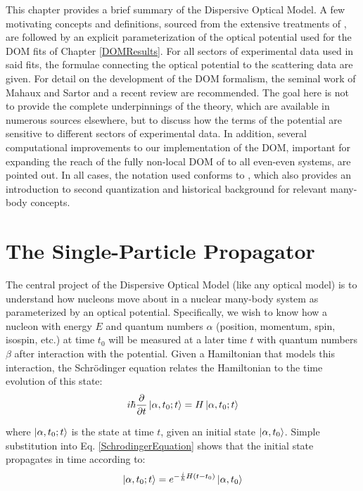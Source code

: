 This chapter provides a brief summary of the Dispersive Optical Model.
A few motivating concepts and definitions, sourced from the extensive treatments of \cite{MahzoonPhDThesis, MBTE},
are followed by an explicit parameterization of the optical potential used for the DOM fits of Chapter \ref{DOMResults}.
For all sectors of experimental data used in said fits, the formulae connecting the optical potential
to the scattering data are given. For detail on the development of the DOM formalism, the seminal
work of Mahaux and Sartor \cite{Mahaux1991} and a recent review \cite{Dickhoff2018} are recommended.
The goal here is not to provide the complete underpinnings of the theory, which are available in
numerous sources elsewhere, but to discuss how the terms of the potential are sensitive
to different sectors of experimental data.
In addition, several computational improvements to our implementation of the DOM, important for
expanding the reach of the fully non-local DOM of \cite{MahzoonPhDThesis} to all even-even systems,
are pointed out. In all cases, the notation used conforms to \cite{MBTE}, which also provides an
introduction to second quantization and historical background for relevant many-body concepts.

\section{The Single-Particle Propagator}
The central project of the Dispersive Optical Model (like any optical model) is
to understand how nucleons move about in a nuclear many-body system as parameterized by an optical
potential.
Specifically, we wish to know
how a nucleon with energy $E$ and quantum numbers $\alpha$
(position, momentum, spin, isospin, etc.) at time $t_{0}$ will be measured at a
later time $t$ with quantum numbers $\beta$ after interaction with the
potential. Given a
Hamiltonian that models this interaction, the Schr\"odinger equation
relates the Hamiltonian to the time evolution of this state:
\begin{equation} \label{SchrodingerEquation}
    i\hbar\frac{\partial}{\partial t}\ket{\alpha, t_{0}; t} = H\ket{\alpha, t_{0}; t}
\end{equation}

\noindent
where $\ket{\alpha, t_{0}; t}$ is the state at time $t$, given an initial state
$\ket{\alpha, t_{0}}$. Simple substitution into Eq. \ref{SchrodingerEquation} shows
that the initial state propagates in time according to:
\begin{equation}
    \ket{\alpha, t_{0}; t} = e^{-\frac{i}{\hbar}H(t-t_{0})}\ket{\alpha, t_{0}}
\end{equation}

